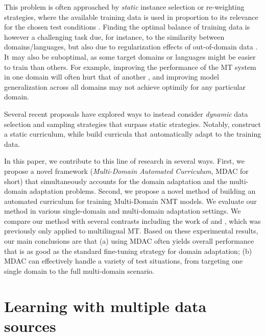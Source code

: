 \documentclass[11pt]{article}
\begin{document}
This problem is often approached by \emph{static} instance selection or re-weighting strategies, where the available training data is used in proportion to its relevance for the chosen test conditions \citep{Moore10selection,Axelrod11domain}. Finding the optimal balance of training data is however a challenging task due, for instance, to the similarity between domains/languages, but also due to regularization effects of out-of-domain data \citep{Miceli-barone17regularization}. It may also be suboptimal, as some target domains or languages might be easier to train than others. For example, improving the performance of the MT system in one domain will often hurt that of another \citep{Vanderwees17dynamic, Britz17mixing}, and improving model generalization across all domains \citep{koehn18findings} may not achieve optimily for any particular domain. 

Several recent proposals
have explored ways to instead consider \emph{dynamic} data selection and sampling strategies that surpass static strategies. Notably, \citet{Vanderwees17dynamic,Zhang19curriculum} construct a static curriculum, while \citet{Graves17automated,Platanios19competence,Kumar19reinforcement,Wang20balancing,Wang20learning-multi} build curricula that automatically adapt to the training data.

In this paper, we contribute to this line of research in several ways. First, we propose a novel framework (\emph{Multi-Domain Automated Curriculum}, MDAC for short) that simultaneously accounts for the domain adaptation and the multi-domain adaptation problems. Second, we propose a novel method of building an automated curriculum for training Multi-Domain NMT models. We evaluate our method in various single-domain and multi-domain adaptation settings. We compare our method with several contrasts including the work of \citet{Zhang19curriculum} and \citet{Wang20balancing}, which was previously only applied to multilingual MT.
Based on these experimental results, our main conclusions are that (a) using MDAC often yields overall performance that is as good as the standard fine-tuning strategy for domain adaptation; (b) MDAC can effectively handle a variety of test situations, from targeting one single domain to the full multi-domain scenario. %

\section{Learning with multiple data sources} \label{sec:mdmt}
\end{document}
